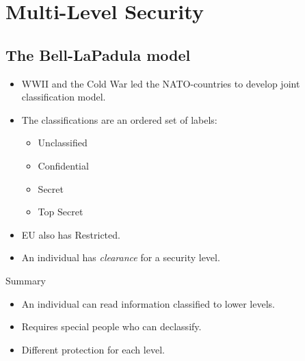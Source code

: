 \mode*




\section{Multi-Level Security}

\subsection{The Bell-LaPadula model}

\begin{frame}
  \begin{itemize}
    \item WWII and the Cold War led the NATO-countries to develop joint 
      classification model.

    \item The classifications are an ordered set of labels:

      \begin{itemize}
        \item Unclassified
        \item Confidential
        \item Secret
        \item Top Secret
      \end{itemize}

    \item EU also has Restricted.
  \end{itemize}
\end{frame}

\begin{frame}
  \begin{definition}
    \begin{itemize}
      \item An individual has \emph{clearance} for a security level.
    \end{itemize}
  \end{definition}

  \pause

  \begin{block}{Summary}
    \begin{itemize}
      \item An individual can read information classified to lower levels.
      \item Requires special people who can declassify.
      \item Different protection for each level.
    \end{itemize}
  \end{block}
\end{frame}

